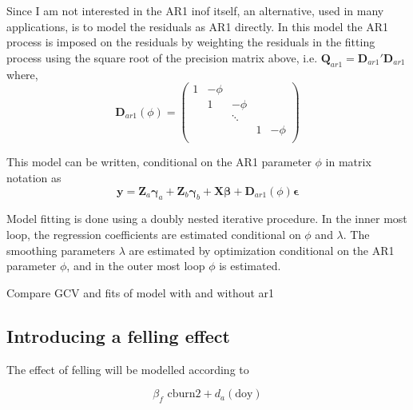 Since I am not interested in the AR1 inof itself, an alternative, used in many applications, is to model the residuals as AR1 directly.  In this model the AR1 process is imposed on the residuals by weighting the residuals in the fitting process using the square root of the precision matrix above, i.e. $\bm{Q}_{ar1} = \bm{D}_{ar1}'\bm{D}_{ar1}$ where,
\begin{equation}
\bm{D}_{ar1}(\phi) = 
\begin{pmatrix} 
1 & -\phi &        &   &       \\ 
  &     1 & -\phi  &   &       \\ 
  &       & \ddots &   &       \\ 
  &       &        & 1 & -\phi \\ 
\end{pmatrix}
\end{equation}

This model can be written, conditional on the AR1 parameter $\phi$ in matrix notation as
\begin{equation}
  \bm{y} = \bm{Z}_a \bm{\gamma}_a + \bm{Z}_b \bm{\gamma}_b + \bm{X} \bm{\beta} + \bm{D}_{ar1}(\phi)\bm{\epsilon}
\end{equation}

Model fitting is done using a doubly nested iterative procedure. In the inner most loop, the regression coefficients are estimated conditional on $\phi$ and $\lambda$.  The smoothing parameters $\lambda$ are estimated by optimization conditional on the AR1 parameter $\phi$, and in the outer most loop $\phi$ is estimated.

Compare GCV and fits of model with and without ar1





\subsection{Introducing a felling effect}

The effect of felling will be modelled according to

\begin{equation}
  \beta_f \text{ cburn2} + d_a(\text{doy})
\end{equation}

